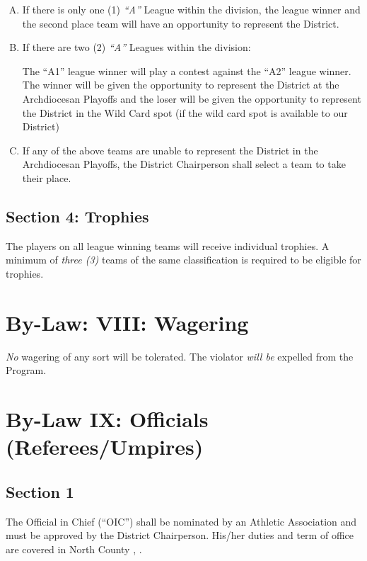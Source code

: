 \begin{enumerate}[A.]
    \item If there is only one (1) {\em ``A''} League within the division, the league winner and the sec­ond place team will have an opportunity to represent the District.
    \item If there are two (2) {\em ``A''} Leagues within the division:
    
    The ``A1'' league winner will play a contest against the “A2” league winner. The winner will be given the opportunity to represent the District at the Archdiocesan Playoffs and the loser will be given the opportunity to represent the District in the Wild Card spot (if the wild card spot is available to our District)

    \item If any of the above teams are unable to represent the District in the Archdiocesan Playoffs, the District Chairperson shall select a team to take their place.
\end{enumerate}

\subsection{Section 4: Trophies}
\label{ssec:bylaw-7-4}
The players on all league winning teams will receive individual trophies.  A minimum of {\em three (3)} teams of the same classification is required to be eligible for trophies.

\section{By-Law: VIII: Wagering}
\label{sec:bylaw-8}
{\em No} wagering of any sort will be tolerated. The violator {\em will be} expelled from the Program.

\section{By-Law IX: Officials (Referees/Umpires)}
\label{sec:bylaw-9}
\subsection{Section 1}
\label{ssec:bylaw-9-1}
The Official in Chief (``OIC'') shall be nominated by an Athletic Association and must be approved by the District Chairperson.  His/her duties and term of office are covered in North County , .

